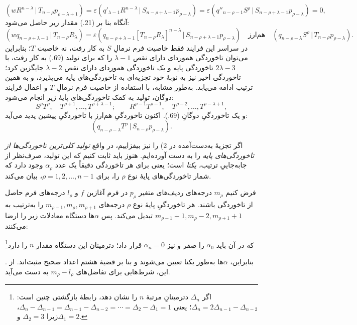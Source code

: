 \documentclass[11pt]{article}
\providecommand{\srcnumdisplay}[3][3.4em]{%
  \par\smallskip\noindent
  \babelsublr{\begin{minipage}[t]{#1}\vspace*{0pt}\srcLTR{#2}\end{minipage}%
  \begin{minipage}[t]{\dimexpr\linewidth-#1\relax}\vspace*{0pt}\centering
  \(\displaystyle #3\)\end{minipage}}\par\smallskip}
\newcommand{\srcLTR}[1]{\relax\ifmmode\text{\mbox{\babelsublr{\foreignlanguage{english}{#1}}}}\else\babelsublr{\foreignlanguage{english}{#1}}\fi}
\newcommand{\srcfn}[2]{\begingroup\renewcommand{\thefootnote}{\srcLTR{#1}}\footnote{#2}\addtocounter{footnote}{-1}\endgroup}
\providecommand{\pair}[2]{(#1\,|\,#2)}
\providecommand{\eps}{\varepsilon}
\begin{document}
\[
 \pair{wR^{n-\lambda}}{T_{n-\rho}p_{\rho-\lambda+1}}
 =\eps\pair{q'_{\lambda-1}R^{n-\lambda}}{S_{n-\rho+\lambda-1}p_{\rho-\lambda}}
 =\eps\pair{q''_{n-\rho-1}S^\rho}{S_{n-\rho+\lambda-1}p_{\rho-\lambda}}=0,
\]
آنگاه بنا بر (21.) مقدار زیر حاصل می‌شود:
\[
 \pair{wq_{n-\rho+\lambda-1}}{T_{n-\rho}R_\lambda}
 =\eps\pair{q_{n-\rho+\lambda-1}[T_{n-\rho}R_\lambda]^{n-\lambda}}{S_{n-\rho+\lambda-1}p_{\rho-\lambda}}
 \quad\text{هم‌ارز}\quad
 \pair{q_{n-\rho-\lambda}S^\rho}{T_{n-\rho}p_{\rho-\lambda}}.
\]
در سراسر این فرایند فقط خاصیت فرم نرمالِ $S$ به کار رفت، نه خاصیت $T$؛ بنابراین می‌توان تاخوردگی هموردای دارای نقص $\lambda-1$ را که برای تولید (69.) به کار رفت، با $2\lambda-3$ تاخوردگی پایه و یک تاخوردگی هموردای دارای نقص $\lambda-2$ جایگزین کرد؛ تاخوردگی اخیر نیز به نوبهٔ خود تجزیه‌ای به تاخوردگی‌های پایه می‌پذیرد، و به همین ترتیب ادامه می‌یابد. به‌طور مشابه، با استفاده از خاصیت فرم نرمالِ $T$ و اعمال فرایند دوگان، تولید به کمک تاخوردگی‌های پایهٔ زیر انجام می‌شود:
\[
 S^\rho T^\rho,\quad T^{\rho+1},\ldots,T^{\rho+\lambda-1};
 \qquad R^{\rho-1}T^{\rho-1},\quad T^{\rho-2},\ldots,T^{\rho-\lambda+1},
\]
و یک تاخوردگیِ دوگانِ (69.). اکنون تاخوردگیِ هم‌ارز با تاخوردگیِ پیشین پدید می‌آید:
\[
 \pair{q_{n-\rho-\lambda}T^\rho}{S_{n-\rho}p_{\rho-\lambda}}.
\]

اگر تجزیهٔ به‌دست‌آمده در 2) را نیز بیفزاییم، در واقع \emph{تولید کلی‌ترین تاخوردگی‌ها از تاخوردگی‌های پایه} را به دست آورده‌ایم. هنوز باید ثابت کنیم که این تولید، صرف‌نظر از جابه‌جاییِ ترتیب، \emph{یکتا} است؛ یعنی برای هر تاخوردگی دقیقاً یک عدد $\alpha_\rho$ وجود دارد که شمار تاخوردگی‌های پایهٔ نوع $\rho$ را، برای $\rho=1,2,\ldots,n-1$، بیان می‌کند.

فرض کنیم $m_\rho$ درجه‌های ردیف‌های متغیر $p_\rho$ در فرم آغازین $f$ و $l_\rho$ درجه‌های فرم حاصل از تاخوردگی باشند. هر تاخوردگیِ پایهٔ نوع $\rho$ درجه‌های $m_{\rho-1},m_\rho,m_{\rho+1}$ را به‌ترتیب به $m_{\rho-1}+1,m_\rho-2,m_{\rho+1}+1$ تبدیل می‌کند. پس $\alpha$ها دستگاه معادلات زیر را ارضا می‌کنند:
\srcnumdisplay[4.2em]{(70.)}{%
 m_\rho-l_\rho=-\alpha_{\rho-1}+2\alpha_\rho-\alpha_{\rho+1},
 \qquad (\rho=1,2,\ldots,n-1)}
که در آن باید $\alpha_0$ را صفر و نیز $\alpha_n=0$ قرار داد؛ دترمینان این دستگاه مقدار $n$ را دارد\srcfn{*)}{اگر $\Delta_n$ دترمینانِ مرتبهٔ $n$ را نشان دهد، رابطهٔ بازگشتی چنین است: $\Delta_n=2\Delta_{n-1}-\Delta_{n-2}$؛ یعنی $\Delta_n-\Delta_{n-1}=\Delta_{n-1}-\Delta_{n-2}=\cdots=\Delta_2-\Delta_1=1$، زیرا $\Delta_2=3$ و$\Delta_1=2$.}. بنابراین، $\alpha$ها به‌طور یکتا تعیین می‌شوند و بنا بر قضیهٔ هشتم اعداد صحیح مثبت‌اند. از این، شرط‌هایی برای تفاضل‌های $m_\rho-l_\rho$ به دست می‌آید.
\end{document}
